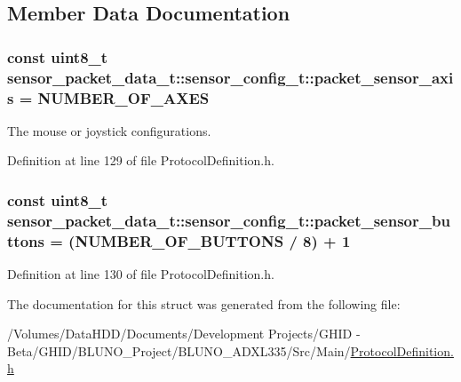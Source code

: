 \subsection{\-Member \-Data \-Documentation}
\hypertarget{structsensor__packet__data__t_1_1sensor__config__t_a08799719eba394b5e4486395e2684ab8}{
\subsubsection[{packet\-\_\-sensor\-\_\-axis}]{\setlength{\rightskip}{0pt plus 5cm}const uint8\-\_\-t {\bf sensor\-\_\-packet\-\_\-data\-\_\-t\-::sensor\-\_\-config\-\_\-t\-::packet\-\_\-sensor\-\_\-axis} = {\bf \-N\-U\-M\-B\-E\-R\-\_\-\-O\-F\-\_\-\-A\-X\-E\-S}}}\label{structsensor__packet__data__t_1_1sensor__config__t_a08799719eba394b5e4486395e2684ab8}


\-The mouse or joystick configurations. 



\-Definition at line 129 of file \-Protocol\-Definition.\-h.

\hypertarget{structsensor__packet__data__t_1_1sensor__config__t_a65f2fd63d76f7ac9326d8f7d6da892e1}{
\subsubsection[{packet\-\_\-sensor\-\_\-buttons}]{\setlength{\rightskip}{0pt plus 5cm}const uint8\-\_\-t {\bf sensor\-\_\-packet\-\_\-data\-\_\-t\-::sensor\-\_\-config\-\_\-t\-::packet\-\_\-sensor\-\_\-buttons} = ({\bf \-N\-U\-M\-B\-E\-R\-\_\-\-O\-F\-\_\-\-B\-U\-T\-T\-O\-N\-S} / 8) + 1}}\label{structsensor__packet__data__t_1_1sensor__config__t_a65f2fd63d76f7ac9326d8f7d6da892e1}


\-Definition at line 130 of file \-Protocol\-Definition.\-h.



\-The documentation for this struct was generated from the following file\-:\begin{DoxyCompactItemize}
\item 
/\-Volumes/\-Data\-H\-D\-D/\-Documents/\-Development Projects/\-G\-H\-I\-D -\/ Beta/\-G\-H\-I\-D/\-B\-L\-U\-N\-O\-\_\-\-Project/\-B\-L\-U\-N\-O\-\_\-\-A\-D\-X\-L335/\-Src/\-Main/\hyperlink{_protocol_definition_8h}{\-Protocol\-Definition.\-h}\end{DoxyCompactItemize}
